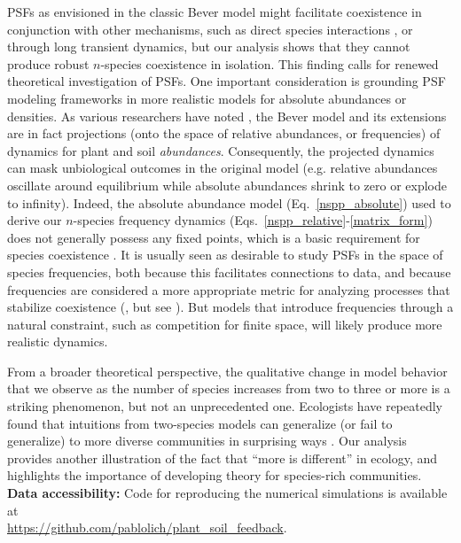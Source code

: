 \documentclass[11pt]{article}
\begin{document}
PSFs as envisioned in the classic Bever model might facilitate coexistence in conjunction with other mechanisms, such as direct species interactions \citep{bever2003soil}, or through long transient dynamics, but our analysis shows that they cannot produce robust $n$-species coexistence in isolation. This finding calls for renewed theoretical investigation of PSFs. One important consideration is grounding PSF modeling frameworks in more realistic models for absolute abundances or densities. As various researchers have noted \citep{kulmatiski2011testing,revilla2013plant,eppinga2018frequency,ke2020effects}, the Bever model and its extensions are in fact projections (onto the space of relative abundances, or frequencies) of dynamics for plant and soil \emph{abundances}. Consequently, the projected dynamics can mask unbiological outcomes in the original model (e.g. relative abundances oscillate around equilibrium while absolute abundances shrink to zero or explode to infinity). Indeed, the absolute abundance model (Eq.~\ref{nspp_absolute}) used to derive our $n$-species frequency dynamics (Eqs.~\ref{nspp_relative}-\ref{matrix_form}) does not generally possess any fixed points, which is a basic requirement for species coexistence \citep{hutson1990existence,hutson1992permanence}. It is usually seen as desirable to study PSFs in the space of species frequencies, both because this facilitates connections to data, and because frequencies are considered a more appropriate metric for analyzing processes that stabilize coexistence (\citet{adler2007niche,eppinga2018frequency}, but see \citet{kandlikar2019winning,ke2020effects}). But models that introduce frequencies through a natural constraint, such as competition for finite space, will likely produce more realistic dynamics.

From a broader theoretical perspective, the qualitative change in model behavior that we observe as the number of species increases from two to three or more is a striking phenomenon, but not an unprecedented one. Ecologists have repeatedly found that intuitions from two-species models can generalize (or fail to generalize) to more diverse communities in surprising ways \citep{strobeck1973n,smale1976differential,barabas2016effect}. Our analysis provides another illustration of the fact that ``more is different'' \citep{anderson1972more} in ecology, and highlights the importance of developing theory for species-rich communities.\\

\noindent \textbf{Data accessibility:} Code for reproducing the numerical simulations is available at\\ \url{https://github.com/pablolich/plant_soil_feedback}.\\



\end{document}
